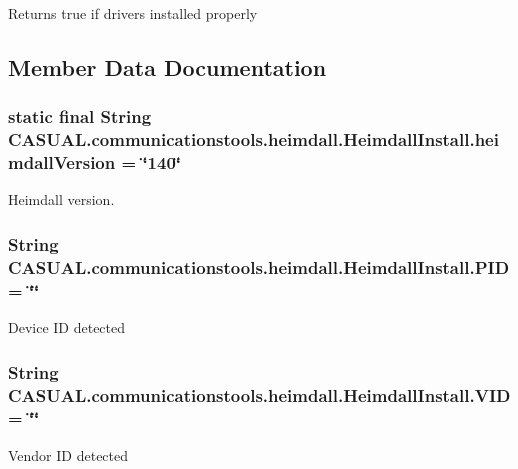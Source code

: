 \begin{DoxyReturn}{Returns}
true if drivers installed properly 
\end{DoxyReturn}


\subsection{Member Data Documentation}
\hypertarget{class_c_a_s_u_a_l_1_1communicationstools_1_1heimdall_1_1_heimdall_install_a278053967a9f7232595f783e2b4fb129}{
\subsubsection[{heimdall\-Version}]{\setlength{\rightskip}{0pt plus 5cm}static final String C\-A\-S\-U\-A\-L.\-communicationstools.\-heimdall.\-Heimdall\-Install.\-heimdall\-Version = \char`\"{}140\char`\"{}\hspace{0.3cm}{\ttfamily [static]}}}\label{class_c_a_s_u_a_l_1_1communicationstools_1_1heimdall_1_1_heimdall_install_a278053967a9f7232595f783e2b4fb129}
Heimdall version. \hypertarget{class_c_a_s_u_a_l_1_1communicationstools_1_1heimdall_1_1_heimdall_install_a0ff9e2aa41e578e740f80f91679a5e39}{
\subsubsection[{P\-I\-D}]{\setlength{\rightskip}{0pt plus 5cm}String C\-A\-S\-U\-A\-L.\-communicationstools.\-heimdall.\-Heimdall\-Install.\-P\-I\-D = \char`\"{}\char`\"{}}}\label{class_c_a_s_u_a_l_1_1communicationstools_1_1heimdall_1_1_heimdall_install_a0ff9e2aa41e578e740f80f91679a5e39}
Device I\-D detected \hypertarget{class_c_a_s_u_a_l_1_1communicationstools_1_1heimdall_1_1_heimdall_install_a2d2c4a0b189fafa46bc517a22ba55532}{
\subsubsection[{V\-I\-D}]{\setlength{\rightskip}{0pt plus 5cm}String C\-A\-S\-U\-A\-L.\-communicationstools.\-heimdall.\-Heimdall\-Install.\-V\-I\-D = \char`\"{}\char`\"{}}}\label{class_c_a_s_u_a_l_1_1communicationstools_1_1heimdall_1_1_heimdall_install_a2d2c4a0b189fafa46bc517a22ba55532}
Vendor I\-D detected 

